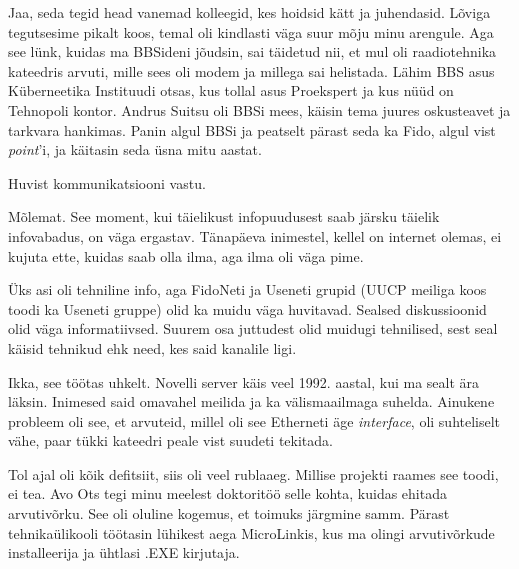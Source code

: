 
Jaa, seda tegid head vanemad kolleegid, kes hoidsid kätt ja 
juhendasid. Lõviga tegutsesime pikalt koos, temal oli kindlasti 
väga suur mõju minu arengule. Aga see lünk, kuidas ma BBSideni 
jõudsin, sai täidetud nii, et mul oli raadiotehnika kateedris 
arvuti, mille sees oli modem ja millega sai helistada. Lähim BBS
asus Küberneetika Instituudi otsas, kus tollal asus 
Proekspert ja kus nüüd on Tehnopoli kontor. Andrus Suitsu 
oli BBSi mees, käisin tema juures oskusteavet ja tarkvara 
hankimas. Panin algul BBSi ja peatselt pärast seda ka Fido, algul vist
\emph{point}'i, ja käitasin seda üsna mitu aastat. 


Huvist kommunikatsiooni vastu.


Mõlemat. See moment, kui täielikust infopuudusest saab järsku täielik 
infovabadus, on väga ergastav. Tänapäeva inimestel, kellel on internet olemas, ei 
kujuta ette, kuidas saab olla ilma, aga ilma oli väga pime.

Üks asi oli tehniline info, aga FidoNeti ja Useneti grupid
(UUCP meiliga koos toodi ka Useneti gruppe) olid ka muidu väga 
huvitavad. Sealsed diskussioonid olid väga 
informatiivsed. Suurem osa 
juttudest olid muidugi tehnilised, sest seal käisid tehnikud ehk need, kes 
said kanalile ligi.


Ikka, see töötas uhkelt. Novelli server käis veel 1992. aastal, kui ma 
sealt ära läksin. Inimesed said omavahel meilida ja ka välismaailmaga 
suhelda. Ainukene probleem oli see, et arvuteid, millel oli see 
Etherneti äge \emph{interface}, oli suhteliselt vähe, paar tükki kateedri 
peale vist suudeti tekitada.


Tol ajal oli kõik defitsiit, siis oli veel rublaaeg. Millise projekti 
raames see toodi, ei tea. Avo Ots tegi minu meelest 
doktoritöö selle kohta, kuidas ehitada arvutivõrku. See oli 
oluline kogemus, et toimuks järgmine samm. Pärast tehnikaülikooli 
töötasin lühikest aega MicroLinkis, kus ma olingi 
arvutivõrkude installeerija ja ühtlasi .EXE kirjutaja.

